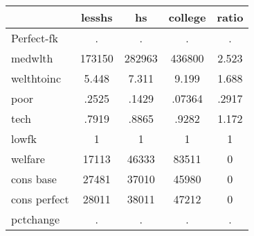 \begin{table}[htbp]
\begin{tabular}{lcccc} \hline \hline
 & lesshs  & hs  & college  & ratio  \\  \hline 
Perfect-fk &         . &         . &         . &         . \\  
medwlth &    173150 &    282963 &    436800 &     2.523 \\  
welthtoinc &     5.448 &     7.311 &     9.199 &     1.688 \\  
poor &     .2525 &     .1429 &    .07364 &     .2917 \\  
tech &     .7919 &     .8865 &     .9282 &     1.172 \\  
lowfk &         1 &         1 &         1 &         1 \\  
welfare &     17113 &     46333 &     83511 &         0 \\  
cons base &     27481 &     37010 &     45980 &         0 \\  
cons perfect &     28011 &     38011 &     47212 &         0 \\  
pctchange &         . &         . &         . &         . \\  
\hline \hline \end{tabular}
\end{table}
